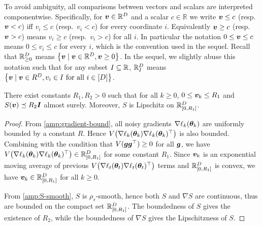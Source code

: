




To avoid ambiguity, all comparisons between vectors and scalars are interpreted componentwise. Specifically, for ${\bm{v}}\in\mathbb R^D$ and a scalar $c\in\mathbb R$ we write ${\bm{v}}\le c$ (resp.\ ${\bm{v}}<c$) iff $v_i\le c$ (resp.\ $v_i<c$) for every coordinate $i$. Equivalently ${\bm{v}}\ge c$ (resp.\ ${\bm{v}}>c$) means $v_i\ge c$ (resp.\ $v_i>c$) for all $i$. In particular the notation $0\le {\bm{v}}\le c$ means $0\le v_i\le c$ for every $i$, which is the convention used in the sequel. Recall that $\mathbb{R}_{\ge 0}^{D}$ means $\left\{{\bm{v}} \mid {\bm{v}} \in \mathbb{R}^D, {\bm{v}} \geq 0\right\}$. In the sequel, we slightly abuse this notation such that for any subset $I \subseteq \mathbb{R}$, $\mathbb{R}_{I}^D$ means $\left\{{\bm{v}} \mid {\bm{v}} \in R^D, v_i \in I \text{ for all }i \in [D]\right\}$.




\begin{lemma}\label{lem:boundedness}
    There exist constants $R_1, R_2 > 0$ such that for all $k \geq 0$, $0 \leq {\bm{v}}_k \leq R_1$ and $S({\bm{v}}) \preceq R_2 {\bm{I}}$ almost surely.  Moreover, $S$ is Lipschitz on $\mathbb{R}_{[0,R_1]}^{D}$.
\end{lemma}
\begin{proof}
    From \cref{amp:gradient-bound}, all noisy gradients $\nabla \ell_k({\bm{\theta}}_k)$ are uniformly bounded by a constant $R$. Hence $V\!\left(\nabla\ell_{k}({\bm{\theta}}_{k}) \nabla\ell_{k}({\bm{\theta}}_{k})^\top\right)$ is also bounded. Combining with the condition that $V({\bm{g}}{\bm{g}}^\top) \geq 0$ for all ${\bm{g}}$, we have $V\!\left(\nabla\ell_{k}({\bm{\theta}}_{k}) \nabla\ell_{k}({\bm{\theta}}_{k})^\top\right) \in \mathbb{R}_{[0,R_1]}^{D}$ for some constant $R_1$. Since ${\bm{v}}_k$ is an exponential moving average of previous $V\!\left(\nabla\ell_{t}({\bm{\theta}}_{t}) \nabla\ell_{t}({\bm{\theta}}_{t})^\top\right)$ terms and $\mathbb{R}_{[0,R_1]}^{D}$ is convex, we have ${\bm{v}}_k \in \mathbb{R}_{[0,R_1]}^{D}$ for all $k \geq 0$. 
    
    From \cref{amp:S-smooth}, $S$ is $\rho_s$-smooth, hence both $S$ and $\nabla S$ are continuous, thus are bounded on the compact set $\mathbb{R}_{[0,R_1]}^{D}$. The boundedness of $S$ gives the existence of $R_2$, while the boundedness of $\nabla S$ gives the Lipschitzness of $S$.
\end{proof}

